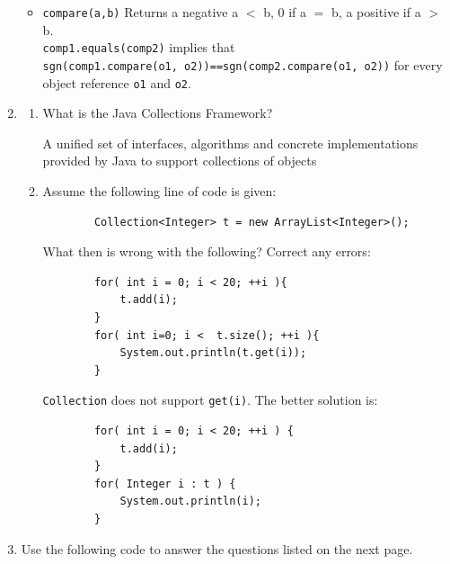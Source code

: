 \documentclass[11pt]{article}
\newenvironment{answer}{\large\lstset{basicstyle=\tiny\ttfamily}\color{white}}{}
\newenvironment{answer}{\large\lstset{basicstyle=\large\ttfamily}\color{red}}{}
\begin{document}
\begin{enumerate}
\begin{answer}
\begin{itemize}
    \item \texttt{compare(a,b)} Returns a negative a $<$ b, 0 if a $=$ b, a positive if a $>$ b. \\
    \texttt{comp1.equals(comp2)} implies that \\ \texttt{sgn(comp1.compare(o1,
    o2))==sgn(comp2.compare(o1, o2))} for every object reference \texttt{o1} and \texttt{o2}.

    \end{itemize}
    \end{answer}

\item 
    \begin{enumerate} 
    \item What is the Java Collections Framework?

    \begin{answer}
        A unified set of interfaces, algorithms and concrete implementations
    provided by Java to support collections of objects
    \end{answer}

    \item Assume the following line of code is given:
    \begin{lstlisting}
        Collection<Integer> t = new ArrayList<Integer>();
    \end{lstlisting}
    What then is wrong with the following? Correct any errors:
    \begin{lstlisting}
        for( int i = 0; i < 20; ++i ){
            t.add(i);
        }
        for( int i=0; i <  t.size(); ++i ){
            System.out.println(t.get(i));
        }
    \end{lstlisting}

    \begin{answer}
    \texttt{Collection} does not support \texttt{get(i)}. The better solution is:
    \begin{lstlisting}
        for( int i = 0; i < 20; ++i ) {
            t.add(i);
        }
        for( Integer i : t ) {
            System.out.println(i);
        }

    \end{lstlisting}
    \end{answer}

    \end{enumerate}
    
\pagebreak
\item Use the following code to answer the questions listed on the next page.


\end{enumerate}
\end{document}
